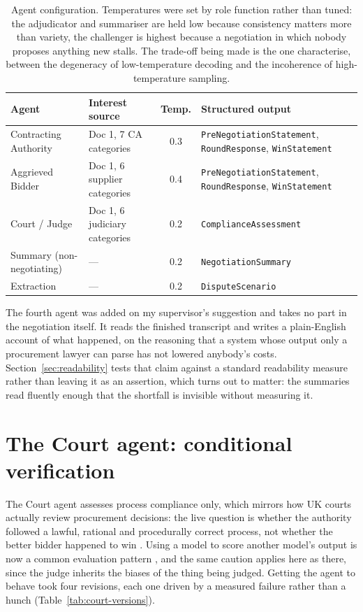 \begin{table}[htbp]
\centering
\footnotesize
\caption[Agent configuration]{Agent configuration. Temperatures were set by role
function rather than tuned: the adjudicator and summariser are held low because
consistency matters more than variety, the challenger is highest because a
negotiation in which nobody proposes anything new stalls. The trade-off being
made is the one \citet{holtzman2020curious} characterise, between the degeneracy
of low-temperature decoding and the incoherence of high-temperature sampling.}
\label{tab:agent-config}
\begin{tabular}{|l|l|c|p{5.4cm}|}
\hline
\textbf{Agent} & \textbf{Interest source} & \textbf{Temp.} & \textbf{Structured output} \\
\hline
Contracting Authority & Doc 1, 7 CA categories & 0.3 &
 \texttt{PreNegotiationStatement}, \texttt{RoundResponse}, \texttt{WinStatement} \\
\hline
Aggrieved Bidder & Doc 1, 6 supplier categories & 0.4 &
 \texttt{PreNegotiationStatement}, \texttt{RoundResponse}, \texttt{WinStatement} \\
\hline
Court / Judge & Doc 1, 6 judiciary categories & 0.2 &
 \texttt{ComplianceAssessment} \\
\hline
Summary (non-negotiating) & --- & 0.2 &
 \texttt{NegotiationSummary} \\
\hline
Extraction & --- & 0.2 &
 \texttt{DisputeScenario} \\
\hline
\end{tabular}
\end{table}

The fourth agent was added on my supervisor's suggestion and takes no part in the
negotiation itself. It reads the finished transcript and writes a plain-English
account of what happened, on the reasoning that a system whose output only a
procurement lawyer can parse has not lowered anybody's costs.
Section~\ref{sec:readability} tests that claim against a standard readability
measure rather than leaving it as an assertion, which turns out to matter: the
summaries read fluently enough that the shortfall is invisible without measuring
it.

\section{The Court agent: conditional verification}
\label{sec:court-design}

The Court agent assesses process compliance only, which mirrors how UK courts
actually review procurement decisions: the live question is whether the authority
followed a lawful, rational and procedurally correct process, not whether the
better bidder happened to win \citep{arrowsmith2014law}. Using a model to score
another model's output is now a common evaluation pattern
\citep{zheng2023judging}, and the same caution applies here as there, since the
judge inherits the biases of the thing being judged. Getting the agent to behave took four revisions,
each one driven by a measured failure rather than a hunch
(Table~\ref{tab:court-versions}).

